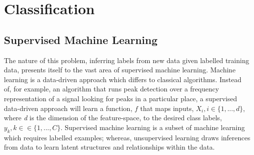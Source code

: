 \section{Classification}
\label{sec:pl-clf}

    \subsection{Supervised Machine Learning}
    \label{subsec:pl-clf-sup}
        The nature of this problem, inferring labels from new data given labelled training data, presents itself to the vast area of supervised machine learning. Machine learning is a data-driven approach which differs to classical algorithms. Instead of, for example, an algorithm that runs peak detection over a frequency representation of a signal looking for peaks in a particular place, a supervised data-driven approach will learn a function, $f$ that maps inputs, $X_i, i\in\{1,...,d\}$, where \textit{d} is the dimension of the feature-space, to the desired class labels, $y_k,k\in\in\{1,...,C\}$. Supervised machine learning is a subset of machine learning which requires labelled examples; whereas, unsupervised learning draws inferences from data to learn latent structures and relationships within the data.
        
